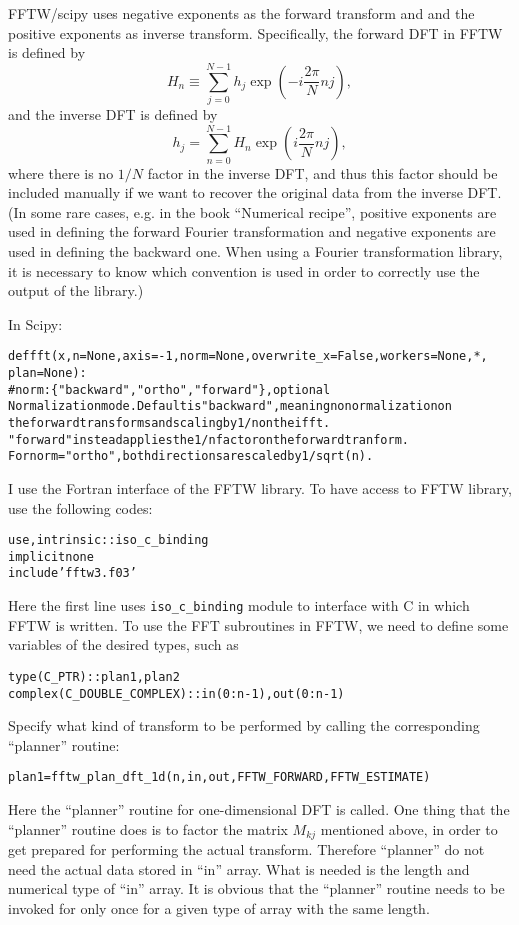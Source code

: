 \documentclass{article}
\newenvironment{tmcode}[1][]{\begin{alltt} }{\end{alltt}}
\begin{document}
FFTW/scipy uses negative exponents as the forward transform and and the
positive exponents as inverse transform. Specifically, the forward DFT in FFTW
is defined by
\begin{equation}
  H_n \equiv \sum_{j = 0}^{N - 1} h_j \exp \left( - i \frac{2 \pi}{N} n j
  \right),
\end{equation}
and the inverse DFT is defined by
\begin{equation}
  h_j = \sum_{n = 0}^{N - 1} H_n \exp \left( i \frac{2 \pi}{N} n j \right),
\end{equation}
where there is no $1 / N$ factor in the inverse DFT, and thus this factor
should be included manually if we want to recover the original data from the
inverse DFT. (In some rare cases, e.g. in the book ``Numerical
recipe''{\cite{press1992}}, positive exponents are used in defining the
forward Fourier transformation and negative exponents are used in defining the
backward one. When using a Fourier transformation library, it is necessary to
know which convention is used in order to correctly use the output of the
library.)

In Scipy:
\begin{tmcode}
def fft(x, n=None, axis=-1, norm=None, overwrite_x=False, workers=None, *,
        plan=None):
#norm : \{"backward", "ortho", "forward"\}, optional
        Normalization mode. Default is "backward", meaning no normalization on
        the forward transforms and scaling by 1/n on the ifft.
        "forward" instead applies the 1/n factor on the forward tranform.
        For norm="ortho", both directions are scaled by 1/sqrt(n).
\end{tmcode}
I use the Fortran interface of the FFTW library. To have access to FFTW
library, use the following codes:
\begin{tmcode}
use, intrinsic :: iso_c_binding
implicit none
include 'fftw3.f03'
\end{tmcode}
Here the first line uses {\texttt{iso\_c\_binding}} module to interface with
C in which FFTW is written. To use the FFT subroutines in FFTW, we need to
define some variables of the desired types, such as
\begin{tmcode}
type(C_PTR) :: plan1, plan2
complex(C_DOUBLE_COMPLEX) :: in(0:n-1), out(0:n-1)
\end{tmcode}
Specify what kind of transform to be performed by calling the corresponding
``planner'' routine:
\begin{tmcode}
plan1 = fftw_plan_dft_1d(n, in,out, FFTW_FORWARD,FFTW_ESTIMATE)
\end{tmcode}
Here the ``planner'' routine for one-dimensional DFT is called. One thing that
the ``planner'' routine does is to factor the matrix $M_{k j}$ mentioned
above, in order to get prepared for performing the actual transform. Therefore
``planner'' do not need the actual data stored in ``in'' array. What is needed
is the length and numerical type of ``in'' array. It is obvious that the
``planner'' routine needs to be invoked for only once for a given type of
array with the same length.
\end{document}
